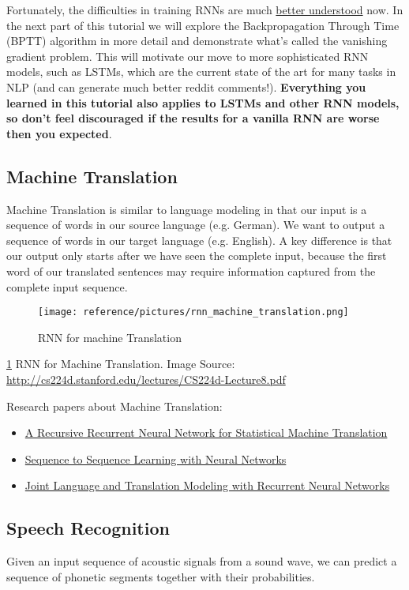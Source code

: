 \documentclass[UTF8,10pt,a4paper]{ctexbook}
\begin{document}
Fortunately, the difficulties in training RNNs are much \href{http://arxiv.org/abs/1211.5063}{better understood} now. In the next part of this tutorial we will explore the Backpropagation Through Time (BPTT) algorithm in more detail and demonstrate what's called the vanishing gradient problem. This will motivate our move to more sophisticated RNN models, such as LSTMs, which are the current state of the art for many tasks in NLP (and can generate much better reddit comments!). \textbf{Everything you learned in this tutorial also applies to LSTMs and other RNN models, so don't feel discouraged if the results for a vanilla RNN are worse then you expected}.


\subsection{Machine Translation}
Machine Translation is similar to language modeling in that our input is a sequence of words in our source language (e.g. German). We want to output a sequence of words in our target language (e.g. English). A key difference is that our output only starts after we have seen the complete input, because the first word of our translated sentences may require information captured from the complete input sequence.

\begin{figure}[ht]
    \centering
    \texttt{[image: reference/pictures/rnn\_machine\_translation.png]}
    \caption{RNN for machine Translation}
    \label{fig:rnn_machine_translation}
\end{figure}
\ref{fig:rnn_machine_translation} RNN for Machine Translation. Image Source: \url{http://cs224d.stanford.edu/lectures/CS224d-Lecture8.pdf}


Research papers about Machine Translation:
\begin{itemize}
\item \href{http://www.aclweb.org/anthology/P14-1140.pdf}{A Recursive Recurrent Neural Network for Statistical Machine Translation}
\item \href{http://papers.nips.cc/paper/5346-sequence-to-sequence-learning-with-neural-networks.pdf}{Sequence to Sequence Learning with Neural Networks}
\item \href{http://research.microsoft.com/en-us/um/people/gzweig/Pubs/EMNLP2013RNNMT.pdf}{Joint Language and Translation Modeling with Recurrent Neural Networks}
\end{itemize}

\subsection{Speech Recognition}
Given an input sequence of acoustic signals from a sound wave, we can predict a sequence of phonetic segments together with their probabilities.
\end{document}
